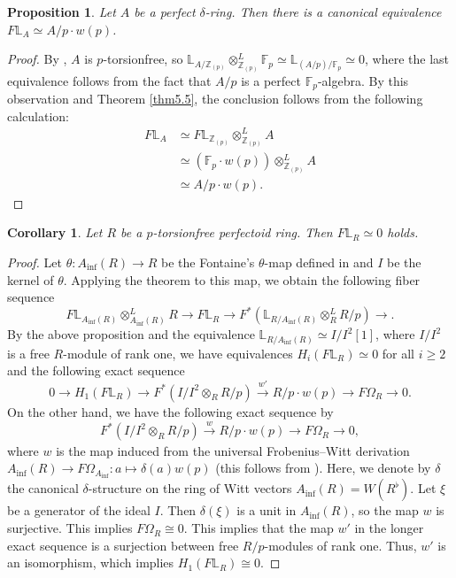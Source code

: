 \documentclass[11pt, a4paper]{amsart}
\theoremstyle{plain}
\newtheorem{prop}[theorem]{Proposition}
\newtheorem{coro}[theorem]{Corollary}
\theoremstyle{definition}
\begin{document}
\begin{prop}\label{pro6.1}
    Let $A$ be a perfect $\delta$-ring. Then there is a canonical equivalence $F\mathbb L_A\simeq A/p\cdot w(p)$.
\end{prop}
\begin{proof}
    By \cite[Lemma 2.28]{BS22}, $A$ is $p$-torsionfree, so $\mathbb L_{A/\mathbb Z_{(p)}}\otimes_{\mathbb Z_{(p)}}^L\mathbb F_p\simeq \mathbb L_{(A/p)/\mathbb F_p}\simeq 0$, where the last equivalence follows from the fact that $A/p$ is a perfect $\mathbb F_p$-algebra. By this observation and Theorem \ref{thm5.5}, the conclusion follows from the following calculation: \begin{align*}
        F\mathbb L_{A}&\simeq F\mathbb L_{\mathbb Z_{(p)}}\otimes^L_{\mathbb Z_{(p)}}A\\&\simeq (\mathbb F_p\cdot w(p))\otimes^L_{\mathbb Z_{(p)}}A\\&\simeq A/p\cdot w(p).
    \end{align*}
\end{proof}

\begin{coro}\label{cor6.2}
    Let $R$ be a $p$-torsionfree perfectoid ring. Then $F\mathbb L_R\simeq 0$ holds.
\end{coro}
\begin{proof}
    Let $\theta:A_{\mathrm{inf}}(R)\to R$ be the Fontaine's $\theta$-map defined in \cite[Section 3.1]{BMS18} and $I$ be the kernel of $\theta$. Applying the theorem to this map, we obtain the following fiber sequence\[F\mathbb L_{A_{\mathrm{inf}}(R)}\otimes_{A_{\mathrm{inf}}(R)}^LR\to F\mathbb L_R\to F^*(\mathbb L_{R/A_{\mathrm{inf}}(R)}\otimes_{R}^LR/p)\to. \] By the above proposition and the equivalence $\mathbb L_{R/A_{\mathrm{inf}}(R)}\simeq I/I^2[1]$, where $I/I^2$ is a free $R$-module of rank one, we have equivalences $H_i(F\mathbb L_R)\simeq 0$ for all $i\ge2$ and the following exact sequence\[0\to H_1(F\mathbb L_R)\to F^*(I/I^2\otimes_RR/p)\xrightarrow[]{w'} R/p\cdot w(p)\to F\Omega_R\to 0.\] On the other hand, we have the following exact sequence by \cite[Proposition 2.3.2]{Sai22}\[F^*(I/I^2\otimes_RR/p)\xrightarrow[]{w} R/p\cdot w(p)\to F\Omega_R\to 0,\]where $w$ is the map induced from the universal Frobenius--Witt derivation $A_{\mathrm{inf}}(R)\to F\Omega_{A_{\mathrm{inf}}}:a\mapsto \delta(a)w(p)$ (this follows from \cite[Lemma 1.3.2]{Sai22}). Here, we denote by $\delta$ the canonical $\delta$-structure on the ring of Witt vectors $A_{\mathrm{inf}}(R)=W(R^{\flat})$. Let $\xi$ be a generator of the ideal $I$. Then $\delta(\xi)$ is a unit in $A_{\mathrm{inf}}(R)$, so the map $w$ is surjective. This implies $F\Omega_R\cong 0$. This implies that the map $w'$ in the longer exact sequence is a surjection between free $R/p$-modules of rank one. Thus, $w'$ is an isomorphism, which implies $H_1(F\mathbb L_R)\cong 0$.
    
\end{proof}
\end{document}
